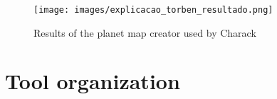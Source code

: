 \documentclass[10pt, conference, compsocconf]{IEEEtran}
\begin{document}
%





\begin{figure}[!t]
\centering
\texttt{[image: images/explicacao\_torben\_resultado.png]}
\caption{Results of the planet map creator used by Charack}
\label{fig:explicacao_torben_resultado}
\end{figure}

\section{Tool organization}
\label{sec:tool-organization}
\end{document}
